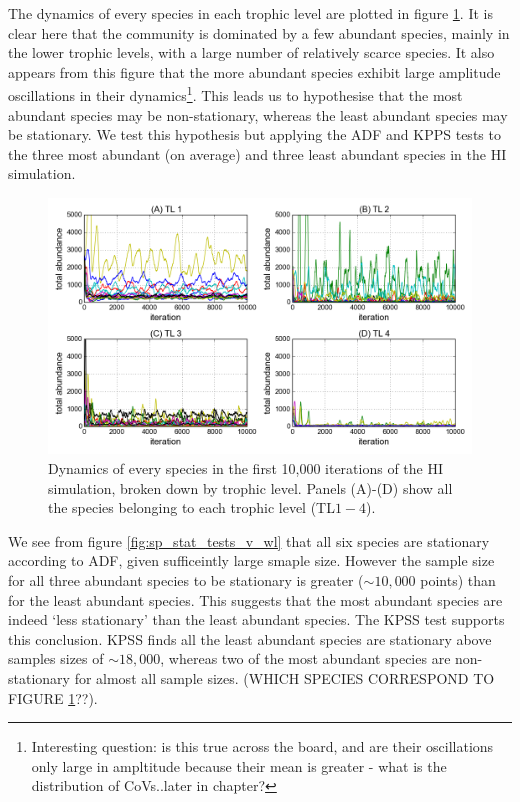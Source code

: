 The dynamics of every species in each trophic level are plotted in figure \ref{fig:dynamics_by_species}. It is clear here that the community is dominated by a few abundant species, mainly in the lower trophic levels, with a large number of relatively scarce species. It also appears from this figure that the more abundant species exhibit large amplitude oscillations in their dynamics\footnote{Interesting question: is this true across the board, and are their oscillations only large in ampltitude because their mean is greater - what is the distribution of CoVs..later in chapter?}. This leads us to hypothesise that the most abundant species may be non-stationary, whereas the least abundant species may be stationary. We test this hypothesis but applying the ADF and KPPS tests to the three most abundant (on average) and three least abundant species in the HI simulation. 

\begin{figure}[ht!]
	\centering
	\includegraphics[width=1.0\linewidth]{"./chapters/chapter04b/figures/hi_sp_by_tl_part10000"}
    \caption{Dynamics of every species in the first 10,000 iterations of the HI simulation, broken down by trophic level. Panels (A)-(D) show all the species belonging to each trophic level (TL$1-4$).}    
    \label{fig:dynamics_by_species}
\end{figure}

We see from figure \ref{fig:sp_stat_tests_v_wl} that all six species are stationary according to ADF, given sufficeintly large smaple size. However the sample size for all three abundant species to be stationary is greater ($\sim 10,000$ points) than for the least abundant species. This suggests that the most abundant species are indeed `less stationary' than the least abundant species. The KPSS test supports this conclusion. KPSS finds all the least abundant species are stationary above samples sizes of $\sim 18,000$, whereas two of the most abundant species are non-stationary for almost all sample sizes. (WHICH SPECIES CORRESPOND TO FIGURE \ref{fig:dynamics_by_species}??).

